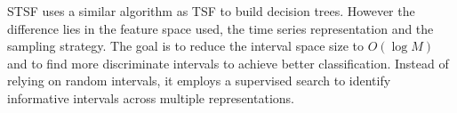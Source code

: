 STSF uses a similar algorithm as TSF to build decision trees. 
However the difference lies in the feature space used, the time series representation 
and the sampling strategy. The goal is to reduce the interval space size 
to $O(\log M)$ and to find more discriminate intervals to achieve better classification.
Instead of relying on random intervals, it employs
a supervised search to identify informative intervals 
across multiple representations.